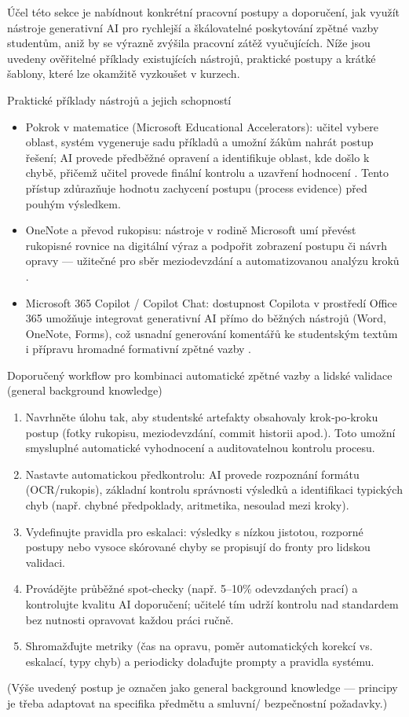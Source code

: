 Účel této sekce je nabídnout konkrétní pracovní postupy a doporučení, jak využít nástroje generativní AI pro rychlejší a škálovatelné poskytování zpětné vazby studentům, aniž by se výrazně zvýšila pracovní zátěž vyučujících. Níže jsou uvedeny ověřitelné příklady existujících nástrojů, praktické postupy a krátké šablony, které lze okamžitě vyzkoušet v kurzech.

Praktické příklady nástrojů a jejich schopností
\begin{itemize}
  \item Pokrok v matematice (Microsoft Educational Accelerators): učitel vybere oblast, systém vygeneruje sadu příkladů a umožní žákům nahrát postup řešení; AI provede předběžné opravení a identifikuje oblast, kde došlo k chybě, přičemž učitel provede finální kontrolu a uzavření hodnocení \cite{kb_ai_101_tipu_pdf_04e4a115_page_8_1}. Tento přístup zdůrazňuje hodnotu zachycení postupu (process evidence) před pouhým výsledkem.
  \item OneNote a převod rukopisu: nástroje v rodině Microsoft umí převést rukopisné rovnice na digitální výraz a podpořit zobrazení postupu či návrh opravy — užitečné pro sběr meziodevzdání a automatizovanou analýzu kroků \cite{kb_ai_101_tipu_pdf_04e4a115_page_8_1}.
  \item Microsoft 365 Copilot / Copilot Chat: dostupnost Copilota v prostředí Office 365 umožňuje integrovat generativní AI přímo do běžných nástrojů (Word, OneNote, Forms), což usnadní generování komentářů ke studentským textům i přípravu hromadné formativní zpětné vazby \cite{kb_ai_101_tipu_pdf_04e4a115_page_3_1}.
\end{itemize}

Doporučený workflow pro kombinaci automatické zpětné vazby a lidské validace (general background knowledge)
\begin{enumerate}
  \item Navrhněte úlohu tak, aby studentské artefakty obsahovaly krok‑po‑kroku postup (fotky rukopisu, meziodevzdání, commit historii apod.). Toto umožní smysluplné automatické vyhodnocení a auditovatelnou kontrolu procesu.
  \item Nastavte automatickou předkontrolu: AI provede rozpoznání formátu (OCR/rukopis), základní kontrolu správnosti výsledků a identifikaci typických chyb (např. chybné předpoklady, aritmetika, nesoulad mezi kroky).
  \item Vydefinujte pravidla pro eskalaci: výsledky s nízkou jistotou, rozporné postupy nebo vysoce skórované chyby se propisují do fronty pro lidskou validaci.
  \item Provádějte průběžné spot‑checky (např. 5–10\% odevzdaných prací) a kontrolujte kvalitu AI doporučení; učitelé tím udrží kontrolu nad standardem bez nutnosti opravovat každou práci ručně.
  \item Shromažďujte metriky (čas na opravu, poměr automatických korekcí vs. eskalací, typy chyb) a periodicky dolaďujte prompty a pravidla systému.
\end{enumerate}
(Výše uvedený postup je označen jako general background knowledge — principy je třeba adaptovat na specifika předmětu a smluvní/ bezpečnostní požadavky.)

